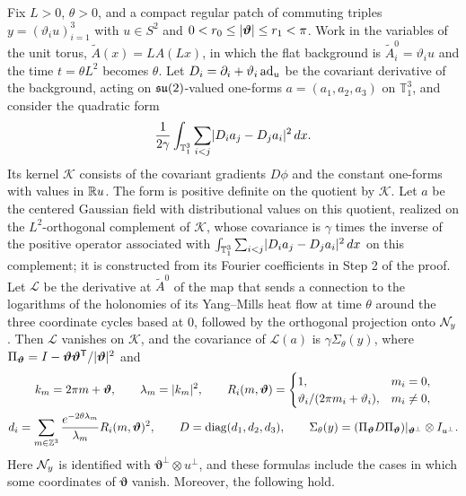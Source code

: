 \begin{theorem}\label{ch27:thm:flowed-log-covariance}
Fix $L>0$, $\theta>0$, and a compact regular patch of commuting triples $y=(\vartheta_iu)_{i=1}^3$ with $u\in S^2$ and $0<r_0\le\lvert \bm\vartheta\rvert\le r_1<\pi$. Work in the variables of the unit torus, $\widetilde A(x)=LA(Lx)$, in which the flat background is $\widetilde A_i^0=\vartheta_iu$ and the time $t=\theta L^2$ becomes $\theta$. Let $D_i=\partial_i+\vartheta_i\operatorname{ad}_u$ be the covariant derivative of the background, acting on $\mathfrak{su}(2)$-valued one-forms $a=(a_1,a_2,a_3)$ on $\mathbb T_1^3$, and consider the quadratic form
\[
 \frac1{2\gamma}\int_{\mathbb T_1^3}\sum_{i<j}\lvert D_ia_j-D_ja_i\rvert^2\,dx.
\]
Its kernel $\mathcal K$ consists of the covariant gradients $D\phi$ and the constant one-forms with values in $\mathbb R u$. The form is positive definite on the quotient by $\mathcal K$. Let $a$ be the centered Gaussian field with distributional values on this quotient, realized on the $L^2$-orthogonal complement of $\mathcal K$, whose covariance is $\gamma$ times the inverse of the positive operator associated with $\int_{\mathbb T_1^3}\sum_{i<j}\lvert D_ia_j-D_ja_i\rvert^2\,dx$ on this complement; it is constructed from its Fourier coefficients in Step 2 of the proof. Let $\mathcal L$ be the derivative at $\widetilde A^0$ of the map that sends a connection to the logarithms of the holonomies of its Yang--Mills heat flow at time $\theta$ around the three coordinate cycles based at $0$, followed by the orthogonal projection onto $\mathcal N_{y}$. Then $\mathcal L$ vanishes on $\mathcal K$, and the covariance of $\mathcal L(a)$ is $\gamma\Sigma_\theta(y)$, where $\Pi_{\bm\vartheta}=I-\bm\vartheta\bm\vartheta^{\mathsf T}/\lvert \bm\vartheta\rvert^2$ and
\begin{gather*}
 k_m=2\pi m+\bm\vartheta,\qquad\lambda_m=\lvert k_m\rvert^2,\qquad R_i(m,\bm\vartheta)=\begin{cases}1,&m_i=0,\\ \vartheta_i/(2\pi m_i+\vartheta_i),&m_i\ne0,\end{cases}\\
 d_i=\sum_{m\in\mathbb Z^3}\frac{e^{-2\theta\lambda_m}}{\lambda_m}R_i(m,\bm\vartheta)^2,\qquad D=\operatorname{diag}(d_1,d_2,d_3),\qquad\Sigma_\theta(y)=(\Pi_{\bm\vartheta}D\Pi_{\bm\vartheta})|_{\bm\vartheta^\perp}\otimes I_{u^\perp}.
\end{gather*}
Here $\mathcal N_{y}$ is identified with $\bm\vartheta^\perp\otimes u^\perp$, and these formulas include the cases in which some coordinates of $\bm\vartheta$ vanish. Moreover, the following hold.

\end{theorem}
